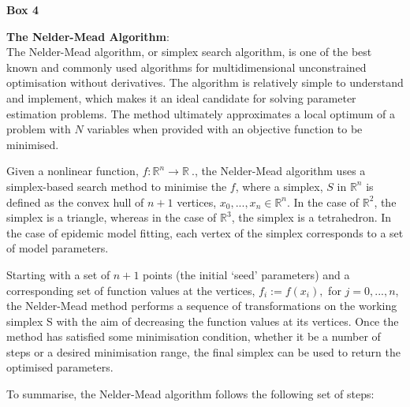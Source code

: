 \documentclass[11pt, a4paper, oneside,titlepage]{article}
\begin{document}
\begin{framed}
{\begin{center}{\bf Box 4}\end{center}}
{\bf The Nelder-Mead Algorithm}:\\
The Nelder-Mead algorithm, or simplex search algorithm, is one of the
best known and commonly used algorithms for multidimensional
unconstrained optimisation without derivatives. The algorithm is
relatively simple to understand and implement, which makes it an ideal
candidate for solving parameter estimation problems. The method
ultimately approximates a local optimum of a problem with $N$
variables when provided with an objective function to be minimised.

Given a nonlinear function, $f : {\mathbb
  R}^n \to {\mathbb R}\ .$, the Nelder-Mead algorithm uses a
simplex-based search method to minimise the $f$, where a simplex, $S$
in ${\mathbb R}^n$ is defined as the convex hull of $n + 1$ vertices,
$x_0,...,x_n \in {\mathbb R}^n$. In the case of ${\mathbb R}^2$, the
simplex is a triangle, whereas in the case of ${\mathbb R}^3$, the
simplex is a tetrahedron. In the case of epidemic model fitting, each
vertex of the simplex corresponds to a set of model parameters.

Starting with a set of $n+1$ points (the initial `seed' parameters)
and a corresponding set of function values at the vertices, $f_i :=
f(x_i),$ for $j = 0,...,n$, the Nelder-Mead method performs a sequence
of transformations on the working simplex S with the aim of decreasing
the function values at its vertices. Once the method has satisfied
some minimisation condition, whether it be a number of steps or a
desired minimisation range, the final simplex can be used to return
the optimised parameters.

To summarise, the Nelder-Mead algorithm follows the following set of
steps:


\end{framed}
\end{document}
